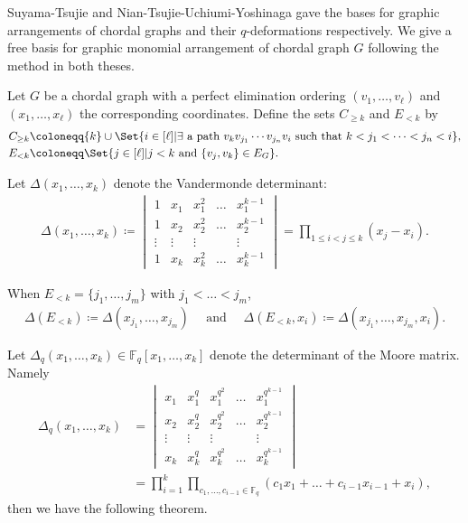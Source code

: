 \documentclass[12pt]{article}
\theoremstyle{plain}%
\theoremstyle{definition}
\begin{document}
Suyama-Tsujie \cite{suyama2019vertex-weighted-dcg} and Nian-Tsujie-Uchiumi-Yoshinaga \cite{nian2024qdeformationchromaticpolynomialsgraphical} gave the bases for graphic arrangements of chordal graphs and their $q$-deformations respectively. We give a free basis for graphic monomial arrangement of chordal graph $G$ following the method in both theses. 

Let $G$ be a chordal graph with a perfect elimination ordering $(v_{1}, \dots, v_{\ell})$ and $(x_{1}, \dots, x_{\ell})$ the corresponding coordinates. 
Define the sets $C_{\geq k}$ and $E_{<k}$ by 
\begin{align*}
C_{\geq k} &\coloneqq \{k\} \cup \Set{i \in [\ell] | \exists\text{ a path } v_{k}v_{j_{1}}\cdots v_{j_{n}}v_{i} \text{ such that } k < j_{1} < \dots < j_{n} < i}, \\
E_{<k} &\coloneqq \Set{j \in [\ell] | j < k \text{ and } \{v_{j},v_{k}\} \in E_{G}}. 
\end{align*}

Let $\Delta(x_{1}, \dots, x_{k})$ denote the Vandermonde determinant: 
\begin{align*}
\Delta(x_{1}, \dots, x_{k}) \coloneqq \begin{vmatrix}
1 & x_{1} & x_{1}^{2} & \dots & x_{1}^{k-1} \\
1 & x_{2} & x_{2}^{2} &  \dots & x_{2}^{k-1} \\
\vdots & \vdots & \vdots &  & \vdots \\
1 & x_{k} & x_{k}^{2} & \dots & x_{k}^{k-1}
\end{vmatrix} 
= \prod_{1 \leq i < j \leq k}(x_{j}-x_{i}). 
\end{align*}

When $E_{<k} = \{j_{1}, \dots, j_{m}\}$ with $j_{1} < \dots < j_{m}$, 
\begin{align*}
\Delta(E_{<k}) \coloneqq \Delta(x_{j_{1}}, \dots, x_{j_{m}}) 
\quad \text{ and } \quad
\Delta(E_{<k}, x_{i}) \coloneqq \Delta(x_{j_{1}}, \dots, x_{j_{m}}, x_{i}). 
\end{align*}

Let $\Delta_{q}(x_{1}, \dots, x_{k}) \in \mathbb{F}_{q}[x_{1}, \dots, x_{k}]$ denote the determinant of the Moore matrix. 
Namely 
\begin{align*}
\Delta_{q}(x_{1}, \dots, x_{k}) &= \begin{vmatrix}
x_{1} & x_{1}^{q} & x_{1}^{q^{2}} & \dots & x_{1}^{q^{k-1}} \\
x_{2} & x_{2}^{q} & x_{2}^{q^{2}} &  \dots & x_{2}^{q^{k-1}} \\
\vdots & \vdots & \vdots &  & \vdots \\
x_{k} & x_{k}^{q} & x_{k}^{q^{2}} & \dots & x_{k}^{q^{k-1}}
\end{vmatrix}\\ 
&= \prod_{i = 1}^{k}\prod_{c_{1}, \dots, c_{i-1} \in \mathbb{F}_{q}}(c_{1}x_{1} + \dots + c_{i-1}x_{i-1} + x_{i}),
\end{align*}
then we have the following theorem.
\end{document}
